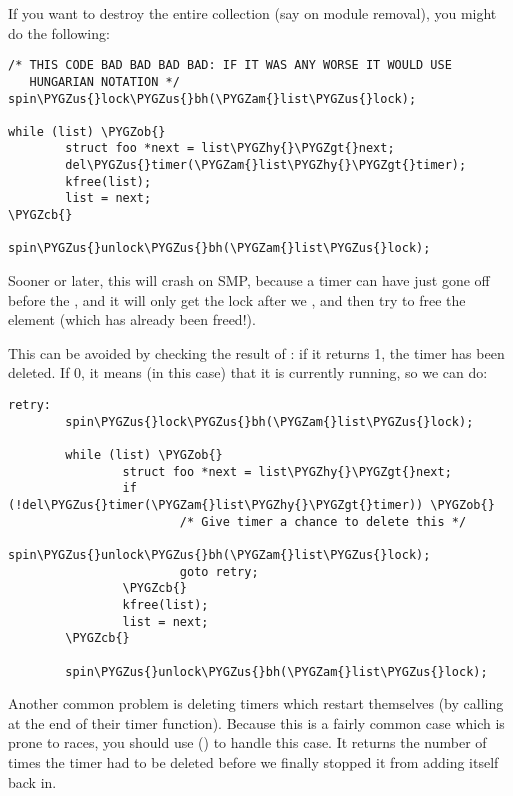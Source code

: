 \documentclass[a4paper,8pt,english]{sphinxmanual}
\def\PYGZus{\char`\_}
\def\PYGZob{\char`\{}
\def\PYGZcb{\char`\}}
\def\PYGZam{\char`\&}
\def\PYGZgt{\char`\>}
\def\PYGZhy{\char`\-}
\begin{document}
If you want to destroy the entire collection (say on module removal),
you might do the following:

\begin{Verbatim}[commandchars=\\\{\}]
/* THIS CODE BAD BAD BAD BAD: IF IT WAS ANY WORSE IT WOULD USE
   HUNGARIAN NOTATION */
spin\PYGZus{}lock\PYGZus{}bh(\PYGZam{}list\PYGZus{}lock);

while (list) \PYGZob{}
        struct foo *next = list\PYGZhy{}\PYGZgt{}next;
        del\PYGZus{}timer(\PYGZam{}list\PYGZhy{}\PYGZgt{}timer);
        kfree(list);
        list = next;
\PYGZcb{}

spin\PYGZus{}unlock\PYGZus{}bh(\PYGZam{}list\PYGZus{}lock);
\end{Verbatim}

Sooner or later, this will crash on SMP, because a timer can have just
gone off before the , and it will only get
the lock after we , and then try to free
the element (which has already been freed!).

This can be avoided by checking the result of
: if it returns 1, the timer has been deleted.
If 0, it means (in this case) that it is currently running, so we can
do:

\begin{Verbatim}[commandchars=\\\{\}]
retry:
        spin\PYGZus{}lock\PYGZus{}bh(\PYGZam{}list\PYGZus{}lock);

        while (list) \PYGZob{}
                struct foo *next = list\PYGZhy{}\PYGZgt{}next;
                if (!del\PYGZus{}timer(\PYGZam{}list\PYGZhy{}\PYGZgt{}timer)) \PYGZob{}
                        /* Give timer a chance to delete this */
                        spin\PYGZus{}unlock\PYGZus{}bh(\PYGZam{}list\PYGZus{}lock);
                        goto retry;
                \PYGZcb{}
                kfree(list);
                list = next;
        \PYGZcb{}

        spin\PYGZus{}unlock\PYGZus{}bh(\PYGZam{}list\PYGZus{}lock);
\end{Verbatim}

Another common problem is deleting timers which restart themselves (by
calling  at the end of their timer function).
Because this is a fairly common case which is prone to races, you should
use  () to
handle this case. It returns the number of times the timer had to be
deleted before we finally stopped it from adding itself back in.
\end{document}
